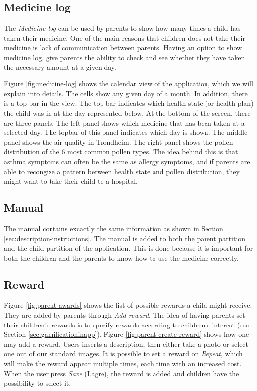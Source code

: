 \subsection{Medicine log}
\label{sec:description-medicine-log}
The \emph{Medicine log} can be used by parents to show how many times a child has taken their medicine. One of the main reasons that children does not take their medicine is lack of communication between parents. Having an option to show medicine log, give parents the ability to check and see whether they have taken the necessary amount at a given day.

Figure \ref{fig:medicine-log} shows the calendar view of the application, which we will explain into details. The cells show any given day of a month. In addition, there is a top bar in the view. The top bar indicates which health state (or health plan) the child was in at the day represented below. At the bottom of the screen, there are three panels. The left panel shows which medicine that has been taken at a selected day. The topbar of this panel indicates which day is shown. The middle panel shows the air quality in Trondheim. The right panel shows the pollen distribution of the 6 most common pollen types. The idea behind this is that asthma symptoms can often be the same as allergy symptoms, and if parents are able to recongize a pattern between health state and pollen distribution, they might want to take their child to a hospital.    


\subsection{Manual}
\label{sec:description-manual}
The manual contains excactly the same information as shown in Section \ref{sec:description-instructions}. The manual is added to both the parent partition and the child partition of the application. This is done because it is important for both the children and the parents to know how to use the medicine correctly. 


\subsection{Reward}
\label{sec:description-manage-rewards}
Figure \ref{fig:parent-awards} shows the list of possible rewards a child might receive. They are added by parents through \emph{Add reward}. The idea of having parents set their children's rewards is to specify rewards according to children's interest (see Section \ref{sec:gamificationinapp}). Figure \ref{fig:parent-create-reward} shows how one may add a reward. Users inserts a description, then either take a photo or select one out of our standard images. It is possible to set a reward on \emph{Repeat}, which will make the reward appear multiple times, each time with an increased cost.        
When the user press \emph{Save} (Lagre), the reward is added and children have the possibility to select it. 
 
